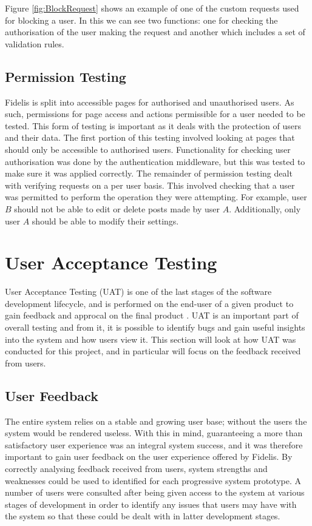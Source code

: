 Figure \ref{fig:BlockRequest} shows an example of one of the custom requests used for blocking a user. In this we can see two functions: one for checking the authorisation of the user making the request and another which includes a set of validation rules. 

\subsection{Permission Testing}
Fidelis is split into accessible pages for authorised and unauthorised users. As such, permissions for page access and actions permissible for a user needed to be tested. This form of testing is important as it deals with the protection of users and their data. The first portion of this testing involved looking at pages that should only be accessible to authorised users. Functionality for checking user authorisation was done by the authentication middleware, but this was tested to make sure it was applied correctly. The remainder of permission testing dealt with verifying requests on a per user basis. This involved checking that a user was permitted to perform the operation they were attempting. For example, user $B$ should not be able to edit or delete posts made by user $A$. Additionally, only user $A$ should be able to modify their settings.

\section{User Acceptance Testing}
User Acceptance Testing (UAT) is one of the last stages of the software development lifecycle, and is performed on the end-user of a given product to gain feedback and approcal on the final product \cite{EconomicTimes:UAT}. UAT is an important part of overall testing and from it, it is possible to identify bugs and gain useful insights into the system and how users view it. This section will look at how UAT was conducted for this project, and in particular will focus on the feedback received from users.

\subsection{User Feedback}
The entire system relies on a stable and growing user base; without the users the system would be rendered useless. With this in mind, guaranteeing a more than satisfactory user experience was an integral system success, and it was therefore important to gain user feedback on the user experience offered by Fidelis. By correctly analysing feedback received from users, system strengths and weaknesses could be used to identified for each progressive system prototype. A number of users were consulted after being given access to the system at various stages of development in order to identify any issues that users may have with the system so that these could be dealt with in latter development stages.

